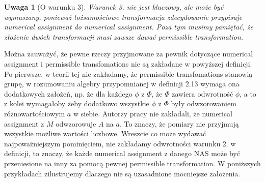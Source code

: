 \documentclass[12pt,a4paper]{report}
\newtheorem{remark}[definition]{Uwaga}
\begin{document}
\begin{remark}[O warunku 3]
Warunek 3. nie jest kluczowy, ale może być wymuszany, ponieważ tożsamościowe transformacja zdecydowanie przypisuje numerical assignment do numerical assignment. Poza tym musimy pamiętać, że złożenie dwóch transformacji musi zawsze dawać permissible transformation.
\end{remark}

  Można zauważyć, że pewne rzeczy przyjmowane za pewnik dotyczące numerical assignment i permissible transfomations  nie są zakładane w powyższej definicji. Po pierwsze, w teorii tej nie zakładamy, że permissible transfomations stanowią grupę, w rozumowaniu algebry przypomnianej w definicji 2.13 wymaga ona  dodatkowych założeń, np. że dla każdego $\phi$ z $\Phi$, że $\Phi$ zawiera odwrotność $\phi$, a to z kolei wymagałoby żeby dodatkowo wszystkie $\phi$ z $\Phi$ były odwzorowaniem różnowartościowym $a$ w siebie. Autorzy pracy {\citep{adams1965theory}} nie zakładali, że numerical assignment z $M$ odwzorowuje $A$ na $a$. To znaczy, że pomiary nie przyjmują wszystkie możliwe wartości liczbowe. Wreszcie co może wydawać najpoważniejszym pominięciem, nie zakładamy odwrotności warunku 2. w definicji, to znaczy, że każde numerical assignment z danego NAS może być przeniesione na inny za pomocą pewnej permissible transformation. W poniższych przykładach zilustrujemy dlaczego nie są uzasadnione mocniejsze założenia.
\end{document}
